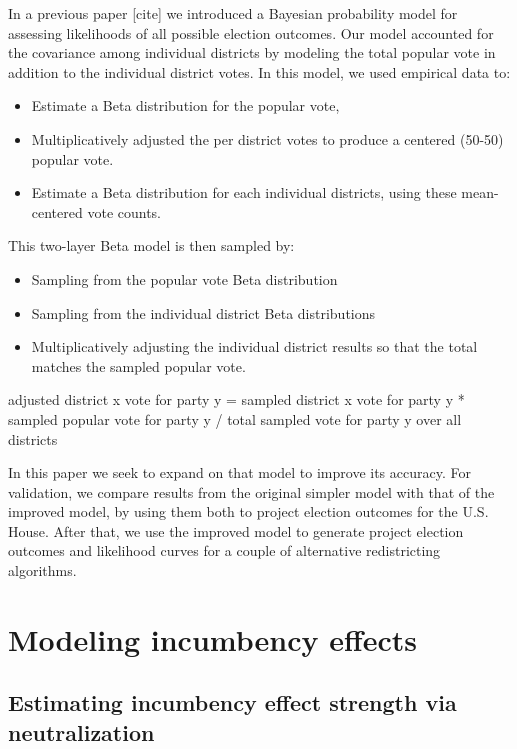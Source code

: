 \documentclass[preprint,12pt]{article}
\begin{document}
In a previous paper [cite] we introduced a Bayesian probability model for assessing likelihoods of all possible election outcomes.  Our model accounted for the covariance among individual districts by modeling the total popular vote in addition to the individual district votes.   In this model, we used empirical data to:
 
\begin{itemize}
\item Estimate a Beta distribution for the popular vote,
\item Multiplicatively adjusted the per district votes to produce a centered (50-50) popular vote.
\item Estimate a Beta distribution for each individual districts, using these mean-centered vote counts.
\end{itemize}

This two-layer Beta model is then sampled by:

\begin{itemize}
\item Sampling from the popular vote Beta distribution
\item Sampling from the individual district Beta distributions
\item Multiplicatively adjusting the individual district results so that the total matches the sampled popular vote.
\end{itemize}

adjusted district x vote for party y = sampled district x vote for party y * sampled popular vote for party y / total sampled vote for party y over all districts

In this paper we seek to expand on that model to improve its accuracy.  For validation, we compare results from the original simpler model with that of the improved model, by using them both to project election outcomes for the U.S. House.  After that, we use the improved model to generate project election outcomes and likelihood curves for a couple of alternative redistricting algorithms.

\section{Modeling incumbency effects}

\subsection{Estimating incumbency effect strength via neutralization}
\end{document}
